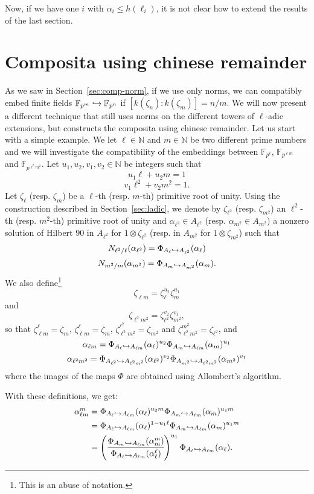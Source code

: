 \documentclass[a4paper,11pt]{article}
\begin{document}
Now, if we have one $i$ with $\alpha_i\leq h(\ell_i)$, it is not clear how to
extend the results of the last section.

\section{Composita using chinese remainder}
\label{sec:comp-crt}

As we saw in Section~\ref{sec:comp-norm}, if we use only norms, we can 
compatibly embed finite fields $\mathbb{F}_{p^m}\hookrightarrow\mathbb{F}_{p^n}$ if
$[k(\zeta_n):k(\zeta_m)]=n/m$. We will now present a different technique that
still uses norms on the different towers of $\ell$-adic extensions, but
constructs the composita using chinese remainder. Let us start with a simple
example. We let $\ell\in\mathbb{N}$ and $m\in\mathbb{N}$ be two different prime numbers and we will
investigate the compatibility of the embeddings between $\mathbb{F}_{p^\ell}$,
$\mathbb{F}_{p^{\ell m}}$ and $\mathbb{F}_{p^{\ell^2 m^2}}$. Let $u_1, u_2, v_1,
v_2\in \mathbb{N}$ be integers such that
\[
  u_1\ell+u_2m=1
\]
\[
  v_1\ell^2+v_2m^2=1.
\]
Let $\zeta_\ell$ (resp. $\zeta_m$) be a $\ell$-th (resp. $m$-th) primitive root
of unity. Using the construction described in Section~\ref{sec:ladic}, we denote
by $\zeta_{\ell^2}$ (resp. $\zeta_{m^2}$) an $\ell^2$-th (resp. $m^2$-th)
primitive root of unity and $\alpha_{\ell^2}\in A_{\ell^2}$ (resp.
$\alpha_{m^2}\in A_{m^2}$) a nonzero solution of Hilbert $90$ in $A_{\ell^2}$
for $1\otimes\zeta_{\ell^2}$ (resp. in $A_{m^2}$ for $1\otimes\zeta_{m^2}$) such that
\[
  N_{\ell^2/\ell}(\alpha_{\ell^2})=\Phi_{A_\ell\hookrightarrow A_{\ell^2}}(\alpha_\ell)
\]
\[
  N_{m^2/m}(\alpha_{m^2})=\Phi_{A_m\hookrightarrow A_{m^2}}(\alpha_m).
\]
We also define\footnote{This is an abuse of notation.}
\[
  \zeta_{\ell m}=\zeta_\ell^{u_2}\zeta_{m}^{u_1}
\]
and
\[
  \zeta_{\ell^2 m^2}=\zeta_{\ell^2}^{v_2}\zeta_{m^2}^{v_1},
\]
so that $\zeta_{\ell m}^\ell = \zeta_m$, $\zeta_{\ell m}^\ell=\zeta_m$,
$\zeta_{\ell^2m^2}^{\ell^2}=\zeta_{m^2}$ and $\zeta_{\ell^2
m^2}^{m^2}=\zeta_{\ell^2}$, and
\[
  \alpha_{\ell m}=\Phi_{A_\ell\hookrightarrow A_{\ell m}}(\alpha_\ell)^{u_2}\Phi_{A_m\hookrightarrow
    A_{\ell m}}(\alpha_m)^{u_1}
\]
\[
  \alpha_{\ell^2 m^2}=\Phi_{A_{\ell^2}\hookrightarrow A_{\ell^2
  m^2}}(\alpha_{\ell^2})^{v_2}\Phi_{A_{m^2}\hookrightarrow
  A_{\ell^2 m^2}}(\alpha_{m^2})^{v_1}
\]
where the images of the maps $\Phi$ are obtained using Allombert's algorithm.

With these definitions, we get:
\begin{align*}
  \alpha_{\ell m}^m &= \Phi_{A_\ell\hookrightarrow A_{\ell m}}(\alpha_\ell)^{u_2m}\Phi_{A_m\hookrightarrow
    A_{\ell m}}(\alpha_m)^{u_1m} \\
  &= \Phi_{A_\ell\hookrightarrow A_{\ell m}}(\alpha_\ell)^{1-u_1\ell}\Phi_{A_m\hookrightarrow
    A_{\ell m}}(\alpha_m)^{u_1m} \\
    &= \left( \cfrac{\Phi_{A_m\hookrightarrow A_{\ell m}}(\alpha_{m}^m)}{\Phi_{A_\ell\hookrightarrow A_{\ell
    m}}(\alpha_\ell^\ell)}\right)^{u_1} \Phi_{A_\ell\hookrightarrow A_{\ell
    m}}(\alpha_\ell).
\end{align*}
\end{document}
